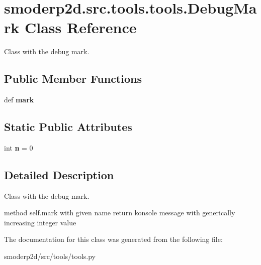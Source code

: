 \hypertarget{classsmoderp2d_1_1src_1_1tools_1_1tools_1_1DebugMark}{\section{smoderp2d.\-src.\-tools.\-tools.\-Debug\-Mark Class Reference}
\label{classsmoderp2d_1_1src_1_1tools_1_1tools_1_1DebugMark}
}


Class with the debug mark.  


\subsection*{Public Member Functions}
\begin{DoxyCompactItemize}
\item 
\hypertarget{classsmoderp2d_1_1src_1_1tools_1_1tools_1_1DebugMark_a8bcee985b3cf188f578d8f7cb3ecd397}{def {\bfseries mark}}\label{classsmoderp2d_1_1src_1_1tools_1_1tools_1_1DebugMark_a8bcee985b3cf188f578d8f7cb3ecd397}

\end{DoxyCompactItemize}
\subsection*{Static Public Attributes}
\begin{DoxyCompactItemize}
\item 
\hypertarget{classsmoderp2d_1_1src_1_1tools_1_1tools_1_1DebugMark_a8b644b7480d760e4870851c64b50a2e6}{int {\bfseries n} = 0}\label{classsmoderp2d_1_1src_1_1tools_1_1tools_1_1DebugMark_a8b644b7480d760e4870851c64b50a2e6}

\end{DoxyCompactItemize}


\subsection{Detailed Description}
Class with the debug mark. 

method self.\-mark with given name return konsole message with generically increasing integer value 

The documentation for this class was generated from the following file\-:\begin{DoxyCompactItemize}
\item 
smoderp2d/src/tools/tools.\-py\end{DoxyCompactItemize}

